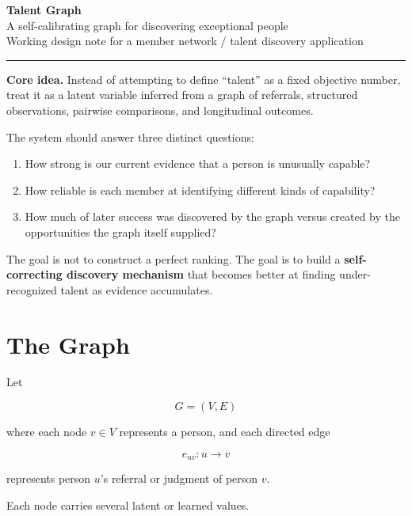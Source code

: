 \documentclass[11pt]{article}
\begin{document}
\begin{center}
    {\LARGE \textbf{Talent Graph}}\\[0.4em]
    {\large A self-calibrating graph for discovering exceptional people}\\[0.7em]
    {\color{graytext}
    Working design note for a member network / talent discovery application}
\end{center}

\vspace{1em}

\hrule

\vspace{1em}

\textbf{Core idea.}
Instead of attempting to define ``talent'' as a fixed objective number, treat it as a
latent variable inferred from a graph of referrals, structured observations,
pairwise comparisons, and longitudinal outcomes.

The system should answer three distinct questions:

\begin{enumerate}[label=\arabic*.]
    \item How strong is our current evidence that a person is unusually capable?
    \item How reliable is each member at identifying different kinds of capability?
    \item How much of later success was discovered by the graph versus created by the opportunities the graph itself supplied?
\end{enumerate}

The goal is not to construct a perfect ranking. The goal is to build a
\textbf{self-correcting discovery mechanism} that becomes better at finding
under-recognized talent as evidence accumulates.

\section{The Graph}

Let

\[
G = (V,E)
\]

where each node \(v \in V\) represents a person, and each directed edge

\[
e_{uv}: u \rightarrow v
\]

represents person \(u\)'s referral or judgment of person \(v\).

Each node carries several latent or learned values.
\end{document}
